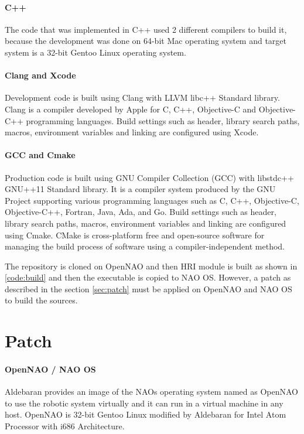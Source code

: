 \paragraph*{C++} The code that was implemented in C++ used 2 different compilers to build it, because the development was done on 64-bit Mac operating system and target system is a 32-bit Gentoo Linux operating system. 

\paragraph*{\indent Clang and Xcode} Development code is built using Clang with LLVM libc++ Standard library. Clang is a compiler developed by Apple for C, C++, Objective-C and Objective-C++ programming languages. Build settings such as header, library search paths, macros, environment variables and linking are configured using Xcode. 

\paragraph*{\indent GCC and Cmake} Production code is built using GNU Compiler Collection (GCC) with libstdc++ GNU++11 Standard library. It is a compiler system produced by the GNU Project supporting various programming languages such as C, C++, Objective-C, Objective-C++, Fortran, Java, Ada, and Go. Build settings such as header, library search paths, macros, environment variables and linking are configured using Cmake. CMake is cross-platform free and open-source software for managing the build process of software using a compiler-independent method. 

The repository is cloned on OpenNAO and then HRI module is built as shown in \ref{code:build} and then the executable is copied to NAO OS. However, a patch as described in the section \ref{sec:patch} must be applied on OpenNAO and NAO OS to build the sources.

 \label{code:build}

\section*{Patch} \label{sec:patch} 
\paragraph*{OpenNAO / NAO OS} Aldebaran provides an image of the NAOs operating system named as OpenNAO to use the robotic system virtually and it can run in a virtual machine in any host. OpenNAO is 32-bit Gentoo Linux modified by Aldebaran for Intel Atom Processor with i686 Architecture. 

